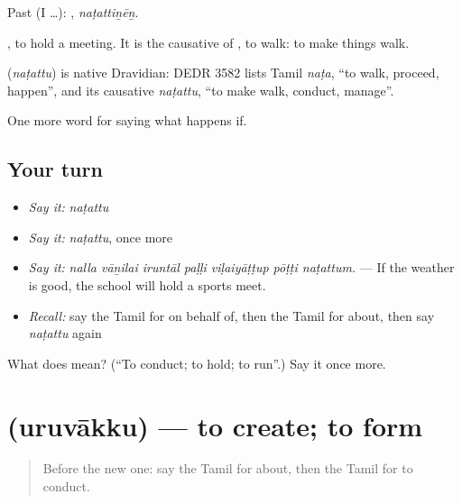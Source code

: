 Past (I …): , \emph{naṭattiṉēṉ}.

 , to hold a meeting. It is the causative of , to walk: to make things walk.

\begin{cousinweb}
\textbf{} (\emph{naṭattu}) is native Dravidian: DEDR 3582 lists Tamil \emph{naṭa}, \textquotedblleft{}to walk, proceed, happen\textquotedblright{}, and its causative \emph{naṭattu}, \textquotedblleft{}to make walk, conduct, manage\textquotedblright{}.
\end{cousinweb}

\begin{grammarlens}[title={What you've built}]
One more word for saying what happens if.
\end{grammarlens}

\subsection*{Your turn}
\begin{itemize}
\raggedright
  \item \emph{Say it:} \emph{naṭattu}
  \item \emph{Say it:} \emph{naṭattu}, once more
  \item \emph{Say it:} \emph{nalla vāṉilai iruntāl paḷḷi viḷaiyāṭṭup pōṭṭi naṭattum.} — If the weather is good, the school will hold a sports meet.
  \item \emph{Recall:} say the Tamil for on behalf of, then the Tamil for about, then say \emph{naṭattu} again
\end{itemize}

\begin{tcolorbox}[breakable,colback=teal!4,colframe=teal!35!black,title={Before you move on}]
What does  mean? (\textquotedblleft{}To conduct; to hold; to run\textquotedblright{}.) Say it once more.
\end{tcolorbox}
\section[\texorpdfstring{\ta{உருவாக்கு} (uruvākku)}{உருவாக்கு (uruvākku)}]{ (uruvākku) — to create; to form}

\label{lesson:TA-C395-uruvakku}



\begin{quote}
Before the new one: say the Tamil for about, then the Tamil for to conduct.
\end{quote}

